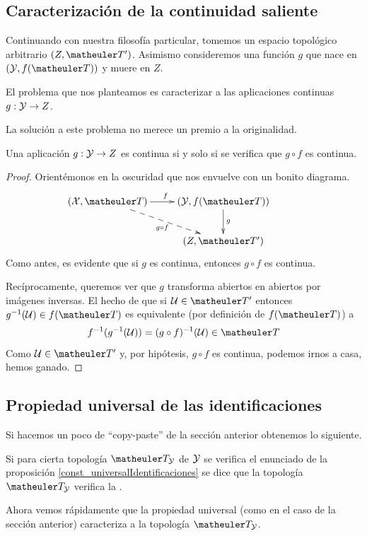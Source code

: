 \subsection{Caracterización de la continuidad saliente}
Continuando con nuestra filosofía particular, tomemos un espacio topológico arbitrario $(Z,\T')$. Asimismo consideremos una función $g$ que nace en $(\Y,f(\T))$ y muere en $Z$.

El problema que nos planteamos es caracterizar a las aplicaciones continuas $g:\mathcal{Y}\to Z$.

La solución a este problema no merece un premio a la originalidad.
\begin{prop}
	\label{const_universalIdentificaciones}
	Una aplicación $g:\mathcal{Y}\to Z$ es continua si y solo si se verifica que $g\circ f$ es continua.
\end{prop}
\begin{proof}
	Orientémonos en la oscuridad que nos envuelve con un bonito diagrama.
	\begin{equation*}
		\xymatrix{
			(\X,\T) \ar[r]^f \ar@{-->}[rd]_{g\circ f} &
			(\Y,f(\T)) \ar[d]^g & \\
			&(Z,\T')
		}
	\end{equation*}
	Como antes, es evidente que si $g$ es continua, entonces $g\circ f$ es continua.
	
	Recíprocamente, queremos ver que $g$ transforma abiertos en abiertos por imágenes inversas. El hecho de que si $\U\in\T'$ entonces $g^{-1}(\U)\in f(\T)$ es equivalente (por definición de $f(\T)$) a
	\[f^{-1}(g^{-1}(\U))=(g\circ f)^{-1}(\U)\in\T\]
	Como $\U\in\T'$ y, por hipótesis, $g\circ f$ es continua, podemos irnos a casa, hemos ganado.
\end{proof}
\subsection{Propiedad universal de las identificaciones}
Si hacemos un poco de ``copy-paste'' de la sección anterior obtenemos lo siguiente. 
\begin{defi}
	Si para cierta topología $\T_\Y$ de $\mathcal{Y}$ se verifica el enunciado de la proposición \ref{const_universalIdentificaciones} se dice que la topología $\T_\Y$ verifica la .
\end{defi}
Ahora vemos rápidamente que la propiedad universal (como en el caso de la sección anterior) caracteriza a la topología $\T_\Y$.


